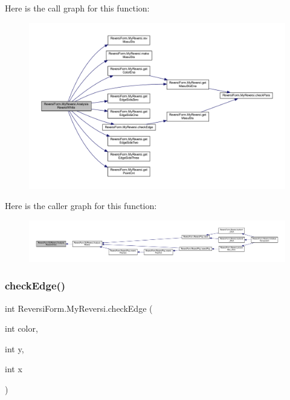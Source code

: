 Here is the call graph for this function\+:\nopagebreak
\begin{figure}[H]
\begin{center}
\leavevmode
\includegraphics[width=350pt]{class_reversi_form_1_1_my_reversi_a2fac17b7121d91063e2d759487f1ed18_cgraph}
\end{center}
\end{figure}
Here is the caller graph for this function\+:\nopagebreak
\begin{figure}[H]
\begin{center}
\leavevmode
\includegraphics[width=350pt]{class_reversi_form_1_1_my_reversi_a2fac17b7121d91063e2d759487f1ed18_icgraph}
\end{center}
\end{figure}
\mbox{\label{class_reversi_form_1_1_my_reversi_aa626cbf9735559841662c8fc413abb98}} 
\subsubsection{\texorpdfstring{check\+Edge()}{checkEdge()}}
{\footnotesize\ttfamily int Reversi\+Form.\+My\+Reversi.\+check\+Edge (\begin{DoxyParamCaption}\item[{int}]{color,  }\item[{int}]{y,  }\item[{int}]{x }\end{DoxyParamCaption})}



